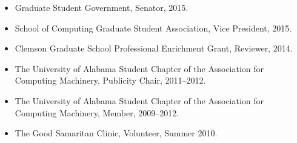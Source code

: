 \begin{itemize}[leftmargin=*]
  \item Graduate Student Government, Senator, 2015.
  \item School of Computing Graduate Student Association, Vice President, 2015.
  \item Clemson Graduate School Professional Enrichment Grant, Reviewer, 2014.
  \item The University of Alabama Student Chapter of the Association for
        Computing Machinery, Publicity Chair, 2011--2012.
  \item The University of Alabama Student Chapter of the Association for
        Computing Machinery, Member, 2009--2012.
  \item The Good Samaritan Clinic, Volunteer, Summer 2010.
\end{itemize}
